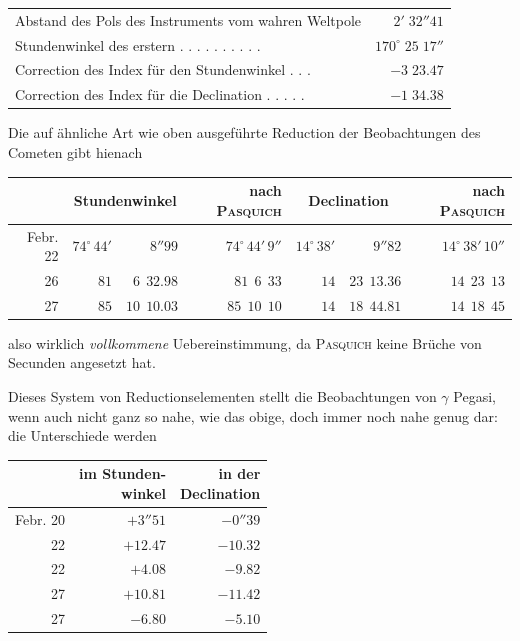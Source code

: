 \begin{center}\footnotesize\setlength{\tabcolsep}{3pt}
\begin{tabular}{@{}l r@{}}
Abstand des Pols des Instruments vom wahren Weltpole & $2'\;32''41$\\
Stundenwinkel des erstern . . . . . . . . . . & $170^\circ\;25\;17''$\\
Correction des Index für den Stundenwinkel . . . & $-3\;23.47$\\
Correction des Index für die Declination . . . . . & $-1\;34.38$
\end{tabular}\end{center}

Die auf ähnliche Art wie oben ausgeführte Reduction der Beobachtungen des Cometen gibt hienach

\begin{center}\footnotesize\setlength{\tabcolsep}{3pt}\begin{tabular}{r | r r | r | r r | r}
 & \multicolumn{2}{c|}{Stundenwinkel} & nach \textsc{Pasquich} & \multicolumn{2}{c|}{Declination} & nach \textsc{Pasquich} \\
\hline
Febr. 22 & $74^\circ\,44'$ & $8''99$ & $74^\circ\,44'\,9''$ & $14^\circ\,38'$ & $9''82$ & $14^\circ\,38'\,10''$ \\
26 & $81$ & $6\ \ 32.98$ & $81\ \ 6\ \ 33$ & $14$ & $23\ \ 13.36$ & $14\ \ 23\ \ 13$ \\
27 & $85$ & $10\ \ 10.03$ & $85\ \ 10\ \ 10$ & $14$ & $18\ \ 44.81$ & $14\ \ 18\ \ 45$ \\
\end{tabular}\end{center}

also wirklich \emph{vollkommene} Uebereinstimmung, da \textsc{Pasquich} keine Brüche von Secunden
angesetzt hat.

Dieses System von Reductionselementen stellt die Beobachtungen von $\gamma$ Pegasi,
wenn auch nicht ganz so nahe, wie das obige, doch immer noch nahe genug dar: die Unterschiede
werden

\begin{center}\footnotesize\setlength{\tabcolsep}{4pt}\begin{tabular}{r | r | r}
 & \shortstack{im Stunden-\\winkel} & \shortstack{in der\\Declination} \\
\hline
Febr. 20 & $+3''51$ & $-0''39$ \\
22 & $+12.47$ & $-10.32$ \\
22 & $+4.08$ & $-9.82$ \\
27 & $+10.81$ & $-11.42$ \\
27 & $-6.80$ & $-5.10$ \\
\end{tabular}\end{center}

